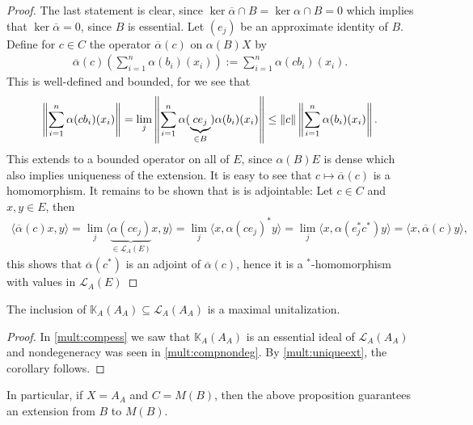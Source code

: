 \begin{proof}
	The last statement is clear, since $\ker \overline \alpha \cap B = \ker \alpha \cap B = 0$ which implies that $\ker \overline \alpha = 0$, since $B$ is essential. Let $(e_j)$ be an approximate identity of $B$. Define for $c \in C$ the operator $\overline \alpha(c)$ on $\alpha(B)X$ by
	\begin{align*}
		\overline \alpha(c) \left( \sum_{i=1}^n \alpha(b_i)(x_i) \right):= \sum_{i=1}^n \alpha(c b_i) (x_i).
	\end{align*}
	This is well-defined and bounded, for we see that
	\begin{align*}
		\left\lVert \sum_{i=1}^n \alpha(c b_i) (x_i) \right\rVert = \lim_{j} \left\lVert \sum_{i=1}^n \alpha(\underbrace{c e_j}_{\in B})\alpha(b_i) (x_i) \right\rVert \leq \left\lVert c \right\rVert \left\lVert \sum_{i=1}^n \alpha(b_i) (x_i)\right\rVert.
	\end{align*}
	This extends to a bounded operator on all of $E$, since $\alpha(B)E$ is dense which also implies uniqueness of the extension. It is easy to see that $c \mapsto \overline \alpha(c)$ is a homomorphism. It remains to be shown that is is adjointable: Let $c \in C$  and $x,y \in E$, then
	\begin{align*}
		\langle \overline \alpha(c) x,y \rangle = \lim_{j} \langle \underbrace{\alpha(ce_j)}_{\in \mathcal{L}_A(E)} x, y \rangle = \lim_j \langle x , \alpha(ce_j)^* y\rangle = \lim_j  \langle x , \alpha(e_j^*c^*) y\rangle =  \langle  x, \overline \alpha(c) y\rangle,
	\end{align*}
	this shows that $\overline \alpha(c^*)$ is an adjoint of $\overline \alpha (c)$, hence it is a $^*$-homomorphism with values in $\mathcal{L}_A(E)$
\end{proof}
\begin{corollary}
	The inclusion of $\mathbb{K}_A(A_A) \subseteq \mathcal{L}_A(A_A)$ is a maximal unitalization.	
\end{corollary}
\begin{proof}
	In \ref{mult:compess} we saw that $\mathbb{K}_A(A_A)$ is an essential ideal of $\mathcal{L}_A(A_A)$ and nondegeneracy was seen in \ref{mult:compnondeg}. By \ref{mult:uniqueext}, the corollary follows.
\end{proof}
In particular, if $X=A_A$ and $C = M(B)$, then the above proposition guarantees an extension from $B$ to $M(B)$.

